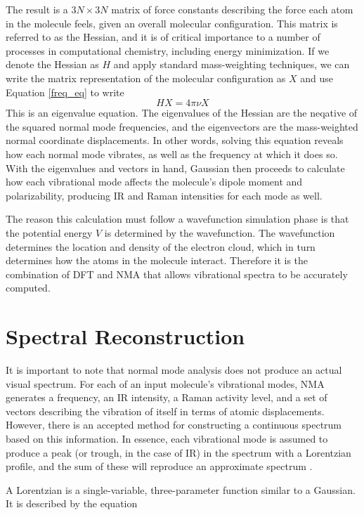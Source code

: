 The result is a $3N \times 3N$ matrix of force constants describing the force each atom in the molecule feels, given an overall molecular configuration. This matrix is referred to as the Hessian, and it is of critical importance to a number of processes in computational chemistry, including energy minimization. If we denote the Hessian as $H$ and apply standard mass-weighting techniques, we can write the matrix representation of the molecular configuration as $X$ and use Equation \ref{freq_eq} to write
\begin{equation}
HX = 4\pi\nu X
\end{equation}
This is an eigenvalue equation. The eigenvalues of the Hessian are the neqative of the squared normal mode frequencies, and the eigenvectors are the mass-weighted normal coordinate displacements. In other words, solving this equation reveals how each normal mode vibrates, as well as the frequency at which it does so. With the eigenvalues and vectors in hand, Gaussian then proceeds to calculate how each vibrational mode affects the molecule's dipole moment and polarizability, producing IR and Raman intensities for each mode as well.

The reason this calculation must follow a wavefunction simulation phase is that the potential energy $V$ is determined by the wavefunction. The wavefunction determines the location and density of the electron cloud, which in turn determines how the atoms in the molecule interact. Therefore it is the combination of DFT and NMA that allows vibrational spectra to be accurately computed.

\section{Spectral Reconstruction}

It is important to note that normal mode analysis does not produce an actual visual spectrum. For each of an input molecule's vibrational modes, NMA generates a frequency, an IR intensity, a Raman activity level, and a set of vectors describing the vibration of itself in terms of atomic displacements. However, there is an accepted method for constructing a continuous spectrum based on this information. In essence, each vibrational mode is assumed to produce a peak (or trough, in the case of IR) in the spectrum with a Lorentzian profile, and the sum of these will reproduce an approximate spectrum \cite{RefWorks:55}.

A Lorentzian is a single-variable, three-parameter function similar to a Gaussian. It is described by the equation

